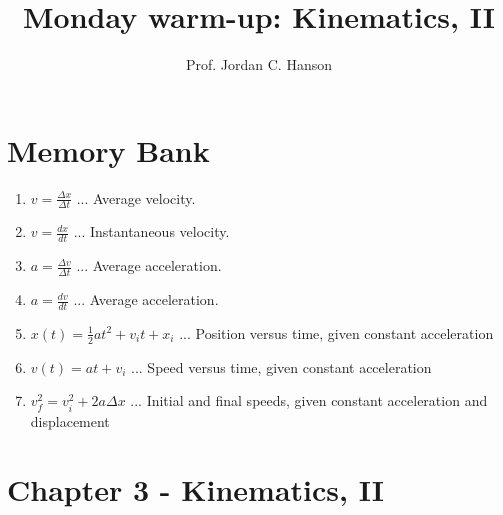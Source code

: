 \documentclass{article}
\begin{document}
\twocolumn

\title{Monday warm-up: Kinematics, II}
\author{Prof. Jordan C. Hanson}

\maketitle

\section{Memory Bank}

\begin{enumerate}
\item $v = \frac{\Delta x}{\Delta t}$ ... Average velocity.
\item $v = \frac{dx}{dt}$ ... Instantaneous velocity.
\item $a = \frac{\Delta v}{\Delta t}$ ... Average acceleration.
\item $a = \frac{dv}{dt}$ ... Average acceleration.
\item $x(t) = \frac{1}{2}at^2 + v_i t + x_i$ ... Position versus time, given constant acceleration
\item $v(t) = at + v_i$ ... Speed versus time, given constant acceleration
\item $v_f^2 = v_i^2 + 2a\Delta x$ ... Initial and final speeds, given constant acceleration and displacement
\end{enumerate}

\section{Chapter 3 - Kinematics, II}
\end{document}
